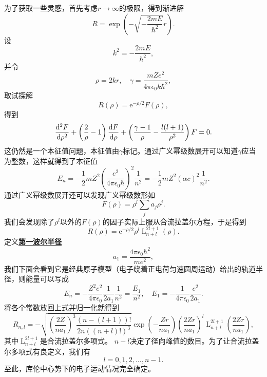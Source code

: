 \documentclass[UTF8, a4paper]{ctexart}
\newcommand*{\ee}{\mathrm{e}}
\DeclareMathOperator{\laguerre}{L}
\newcommand*{\concept}[1]{\underline{\textbf{#1}}}
\begin{document}
为了获取一些灵感，首先考虑$r\to \infty$的极限，得到渐进解
\[
    R = \exp(- \sqrt{- \frac{2 m E}{\hbar^2}} r).
\]
设
\[
    k^2 = - \frac{2 m E}{\hbar^2},
\]
并令
\[
    \rho = 2 k r, \quad \gamma = \frac{m Z e^2}{4\pi \epsilon_0 k \hbar^2}, 
\]
取试探解
\[
    R(\rho) = \ee^{- \rho / 2} F(\rho),
\]
得到
\[
    \dv[2]{F}{\rho} + \left( \frac{2}{\rho} - 1 \right) \dv{F}{\rho} + \left( \frac{\gamma - 1}{\rho} - \frac{l(l+1)}{\rho^2} \right) F = 0.
\]
这仍然是一个本征值问题，本征值由$\gamma$标记。通过广义幂级数展开可以知道$\gamma$应当为整数，这样就得到了本征值
\begin{equation}
    E_n = - \frac{1}{2} m Z^2 \left( \frac{e^2}{4\pi \epsilon_0 \hbar} \right)^2 \frac{1}{n^2} = - \frac{1}{2} m Z^2 (\alpha c)^2 \frac{1}{n^2}.
\end{equation}
通过广义幂级数展开还可以发现广义幂级数形如
\[
    F(\rho) = \rho^l \sum_j a_j \rho^j.
\]
我们会发现除了$\rho^l$以外的$F(\rho)$的因子实际上服从合流拉盖尔方程，于是得到
\[
    R(\rho) = \ee^{-\rho/2} \rho^l \laguerre_{n+l}^{2l+1}(\rho).
\]
定义\concept{第一波尔半径}
\begin{equation}
    a_1 = \frac{4\pi \epsilon_0 \hbar^2}{m e^2},
\end{equation}
我们下面会看到它是经典原子模型（电子绕着正电荷匀速圆周运动）给出的轨道半径，则能量可以写成
\begin{equation}
    E_n = - \frac{Z^2 e^2}{4 \pi \epsilon_0 } \frac{1}{2 a_1} \frac{1}{n^2} = \frac{E_1}{n^2}, \quad E_1 = - \frac{1}{4\pi \epsilon_0} \frac{e^2}{2 a_1}.
    \label{eq:hydrogen-energy}
\end{equation}
将各个常数放回上式并归一化就得到
\begin{equation}
    R_{n, l} = - \sqrt{\left( \frac{2 Z}{n a_1} \right)^3 \frac{(n-(l+1))!}{2n ((n + l)!)^3}} \exp(- \frac{Z r}{n a_1}) \left( \frac{2 Z r}{n a_1} \right)^l \laguerre_{n+l}^{2l+1}\left(\frac{2 Z r}{n a_1}\right),
\end{equation}
其中$\laguerre_{n+l}^{2l+1}$是合流拉盖尔多项式。
$n-l$决定了径向峰值的数目。为了让合流拉盖尔多项式有良定义，我们有
\begin{equation}
    l = 0, 1, 2, \ldots, n-1.
\end{equation}
至此，库伦中心势下的电子运动情况完全确定。
\end{document}
